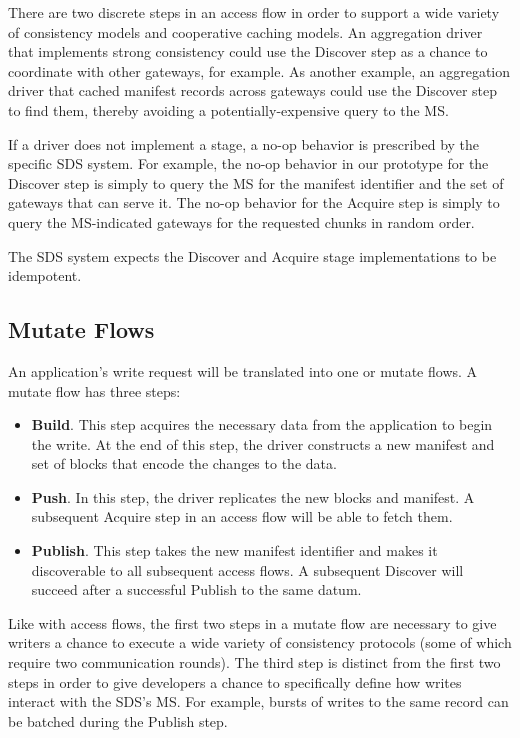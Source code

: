 There are two discrete steps in an access flow in order to support a wide
variety of consistency models and cooperative caching models.  An
aggregation driver that implements strong consistency could use the Discover step
as a chance to coordinate with other gateways, for example.  As
another example, an aggregation driver that cached manifest records
across gateways could use the Discover step to find them, thereby avoiding a
potentially-expensive query to the MS.

If a driver does not implement a stage, a no-op behavior is prescribed by the
specific SDS system.  For example, the no-op behavior in our prototype for the
Discover step is simply to query the MS for the manifest identifier and the 
set of gateways that can serve it.  The no-op behavior for the Acquire
step is simply to query the MS-indicated gateways for the requested chunks
in random order.

The SDS system expects the Discover and Acquire stage implementations to be
idempotent.

\subsection{Mutate Flows}

An application's write request will be translated into one or mutate flows.
A mutate flow has three steps:

\begin{itemize}
    \item \textbf{Build}.  This step acquires the necessary data from the
application to begin the write.  At the end of this step, the driver constructs
a new manifest and set of blocks that encode the changes to the data. 
    \item \textbf{Push}.  In this step, the driver replicates the new blocks and
manifest.  A subsequent Acquire step in an access flow will be able to fetch
them.
    \item \textbf{Publish}.  This step takes the new manifest identifier and makes
it discoverable to all subsequent access flows.  A subsequent Discover will
succeed after a successful Publish to the same datum.
\end{itemize}

Like with access flows, the first two steps in a mutate flow are necessary to give writers a
chance to execute a wide variety of consistency protocols (some of which require
two communication rounds).  The third step is distinct from the first two steps
in order to give developers a chance to specifically define how writes
interact with the SDS's MS.  For example, bursts of writes to the same record
can be batched during the Publish step.

